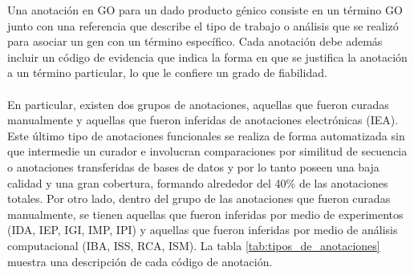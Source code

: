 Una anotación en GO para un dado producto génico consiste en un término GO junto con una referencia que describe el tipo de trabajo o análisis que se realizó para asociar un gen con un término específico. Cada anotación debe además incluir un código de evidencia que indica la forma en que se justifica la anotación a un término particular, lo que le confiere un grado de fiabilidad.\\\\En particular, existen dos grupos de anotaciones, aquellas que fueron curadas manualmente y aquellas que fueron inferidas de anotaciones electrónicas (IEA). Este último tipo de anotaciones funcionales se realiza de forma automatizada sin que intermedie un curador e involucran comparaciones por similitud de secuencia o anotaciones transferidas de bases de datos y por lo tanto poseen una baja calidad y una gran cobertura, formando alrededor del 40\% de las anotaciones totales. Por otro lado, dentro del grupo de las anotaciones que fueron curadas manualmente, se tienen aquellas que fueron inferidas por medio de experimentos (IDA, IEP, IGI, IMP, IPI) y aquellas que fueron inferidas por medio de análisis computacional (IBA, ISS, RCA, ISM). La tabla \ref{tab:tipos_de_anotaciones} muestra una descripción de cada código de anotación.\\\\

